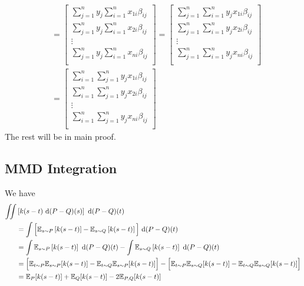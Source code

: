\begin{equation*}
\begin{aligned}
    &= \begin{bmatrix}
        \sum^n_{j=1}y_j\sum^n_{i=1}x_{1i}\beta_{ij} \\
        \sum^n_{j=1}y_j\sum^n_{i=1}x_{2i}\beta_{ij} \\
        \vdots \\
        \sum^n_{j=1}y_j\sum^n_{i=1}x_{ni}\beta_{ij} \\
    \end{bmatrix} = \begin{bmatrix}
        \sum^n_{j=1}\sum^n_{i=1}y_jx_{1i}\beta_{ij} \\
        \sum^n_{j=1}\sum^n_{i=1}y_jx_{2i}\beta_{ij} \\
        \vdots \\
        \sum^n_{j=1}\sum^n_{i=1}y_jx_{ni}\beta_{ij} \\
    \end{bmatrix} \\
    &= \begin{bmatrix}
        \sum^n_{i=1}\sum^n_{j=1} y_jx_{1i}\beta_{ij} \\
        \sum^n_{i=1}\sum^n_{j=1} y_jx_{2i}\beta_{ij} \\
        \vdots \\
        \sum^n_{i=1}\sum^n_{j=1} y_jx_{ni}\beta_{ij} \\
    \end{bmatrix} 
\end{aligned}
\end{equation*}
The rest will be in main proof. 

\subsection{MMD Integration}
\label{appendix:MMD-integration}
We have
\begin{equation*}
\begin{aligned}
    \iint &\left[ k(s-t)\ \mathrm{d}(P-Q)(s) \right]\ \mathrm{d}(P-Q)(t) \\
    &= \int \Big[ \mathbb{E}_{s\sim P}\left[ k(s-t) \right] - \mathbb{E}_{s\sim Q}\left[ k(s-t) \right] \Big] \ \mathrm{d} (P-Q)(t) \\
    &= \int \mathbb{E}_{s\sim P}\left[ k(s-t) \right] \ \mathrm{d} (P-Q)(t) - \int\mathbb{E}_{s\sim Q}\left[ k(s-t) \right] \ \mathrm{d} (P-Q)(t) \\
    &= \Big[\mathbb{E}_{t\sim P}\mathbb{E}_{s\sim P}[k(s-t)] - \mathbb{E}_{t\sim Q}\mathbb{E}_{s\sim P}[k(s-t)] \Big] - \Big[ \mathbb{E}_{t\sim P}\mathbb{E}_{s\sim Q} [k(s-t)] - \mathbb{E}_{t\sim Q}\mathbb{E}_{s\sim Q} [k(s-t)] \Big]\\
    &= \mathbb{E}_P[k(s-t)] + \mathbb{E}_Q[k(s-t)] - 2\mathbb{E}_{P, Q}[k(s-t)] 
\end{aligned}
\end{equation*}

